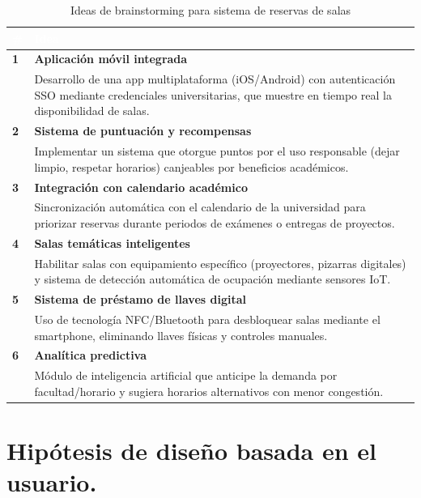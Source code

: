 \documentclass{article}
\begin{document}
  \begin{table}[h]
    \centering
    
    \label{tab:ideas}
    \begin{tabular}{|>{\color{azulun}\bfseries}l|p{10cm}|}
    \hline
    \rowcolor{azulun!20}
    \textcolor{white}{\textbf{\#}} & \textcolor{white}{\textbf{Idea}} \\
    \hline
    1 & \textbf{Aplicación móvil integrada} \\ 
    & Desarrollo de una app multiplataforma (iOS/Android) con autenticación SSO mediante credenciales universitarias, que muestre en tiempo real la disponibilidad de salas. \\
    \hline
    2 & \textbf{Sistema de puntuación y recompensas} \\ 
    & Implementar un sistema que otorgue puntos por el uso responsable (dejar limpio, respetar horarios) canjeables por beneficios académicos. \\
    \hline
    3 & \textbf{Integración con calendario académico} \\ 
    & Sincronización automática con el calendario de la universidad para priorizar reservas durante periodos de exámenes o entregas de proyectos. \\
    \hline
    4 & \textbf{Salas temáticas inteligentes} \\ 
    & Habilitar salas con equipamiento específico (proyectores, pizarras digitales) y sistema de detección automática de ocupación mediante sensores IoT. \\
    \hline
    5 & \textbf{Sistema de préstamo de llaves digital} \\ 
    & Uso de tecnología NFC/Bluetooth para desbloquear salas mediante el smartphone, eliminando llaves físicas y controles manuales. \\
    \hline
    6 & \textbf{Analítica predictiva} \\ 
    & Módulo de inteligencia artificial que anticipe la demanda por facultad/horario y sugiera horarios alternativos con menor congestión. \\
    \hline
    
    \end{tabular}
    \caption{Ideas de brainstorming para sistema de reservas de salas}
    \end{table}

    \newpage

  \section{Hipótesis de diseño basada en el usuario.}
\end{document}
